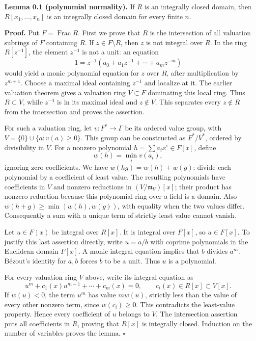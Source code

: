 \documentclass[11pt]{article}
\begin{document}
\textbf{Lemma 0.1 (polynomial normality).} If \(R\) is an integrally
closed domain, then \(R[x_1,\ldots,x_n]\) is an integrally closed domain
for every finite \(n\).

\textbf{Proof.} Put \(F=\operatorname{Frac}R\). First we prove that
\(R\) is the intersection of all valuation subrings of \(F\) containing
\(R\). If \(z\in F\setminus R\), then \(z\) is not integral over \(R\).
In the ring \(R[z^{-1}]\), the element \(z^{-1}\) is not a unit: an
equation \[
1=z^{-1}(a_0+a_1z^{-1}+\cdots+a_mz^{-m})
\] would yield a monic polynomial equation for \(z\) over \(R\), after
multiplication by \(z^{m+1}\). Choose a maximal ideal containing
\(z^{-1}\) and localize at it. The earlier valuation theorem gives a
valuation ring \(V\subset F\) dominating this local ring. Thus
\(R\subset V\), while \(z^{-1}\) is in its maximal ideal and
\(z\notin V\). This separates every \(z\notin R\) from the intersection
and proves the assertion.

For such a valuation ring, let \(v:F^*\to\Gamma\) be its ordered value
group, with \(V=\{0\}\cup\{a:v(a)\geq0\}\). This group can be
constructed as \(F^*/V^*\), ordered by divisibility in \(V\). For a
nonzero polynomial \(h=\sum a_ix^i\in F[x]\), define \[
w(h)=\min_i v(a_i),
\] ignoring zero coefficients. We have \(w(hg)=w(h)+w(g)\): divide each
polynomial by a coefficient of least value. The resulting polynomials
have coefficients in \(V\) and nonzero reductions in
\((V/\mathfrak m_V)[x]\); their product has nonzero reduction because
this polynomial ring over a field is a domain. Also
\(w(h+g)\geq\min(w(h),w(g))\), with equality when the two values differ.
Consequently a sum with a unique term of strictly least value cannot
vanish.

Let \(u\in F(x)\) be integral over \(R[x]\). It is integral over
\(F[x]\), so \(u\in F[x]\). To justify this last assertion directly,
write \(u=a/b\) with coprime polynomials in the Euclidean domain
\(F[x]\). A monic integral equation implies that \(b\) divides \(a^m\).
Bézout's identity for \(a,b\) forces \(b\) to be a unit. Thus \(u\) is a
polynomial.

For every valuation ring \(V\) above, write its integral equation as \[
u^m+c_1(x)u^{m-1}+\cdots+c_m(x)=0,
\qquad c_i(x)\in R[x]\subset V[x].
\] If \(w(u)<0\), the term \(u^m\) has value \(m w(u)\), strictly less
than the value of every other nonzero term, since \(w(c_i)\geq0\). This
contradicts the least-value property. Hence every coefficient of \(u\)
belongs to \(V\). The intersection assertion puts all coefficients in
\(R\), proving that \(R[x]\) is integrally closed. Induction on the
number of variables proves the lemma. \(\square\)
\end{document}
